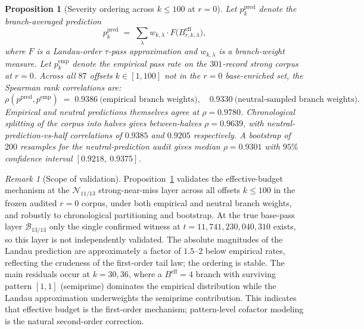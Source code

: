 \documentclass[11pt]{article}
\renewcommand{\_}{\origunderscore\allowbreak}
\newtheorem{proposition}[theorem]{Proposition}
\theoremstyle{definition}
\theoremstyle{remark}
\newtheorem{remark}[theorem]{Remark}
\begin{document}
\begin{proposition}[Severity ordering across $k\le 100$ at $r=0$]\label{prop:beff_ordering}
Let $p_k^{\mathrm{pred}}$ denote the branch-averaged prediction
\[
  p_k^{\mathrm{pred}}
  \;=\;
  \sum_{\lambda} w_{k,\lambda}\cdot
  F\bigl(B^{\mathrm{eff}}_{r,k,\lambda}\bigr),
\]
where $F$ is a Landau-order $\tau$-pass approximation and $w_{k,\lambda}$
is a branch-weight measure. Let $p_k^{\mathrm{emp}}$ denote the
empirical pass rate on the $301$-record strong corpus at $r=0$.
Across all $87$ offsets $k\in[1,100]$ not in the $r=0$
base-enriched set, the Spearman rank correlations are:
\[
  \rho(p^{\mathrm{pred}}, p^{\mathrm{emp}})
  \;=\;
  0.9386\ \text{(empirical branch weights)},
  \quad
  0.9330\ \text{(neutral-sampled branch weights)}.
\]
Empirical and neutral predictions themselves agree at
$\rho = 0.9780$. Chronological splitting of the corpus into halves
gives between-halves $\rho = 0.9639$, with neutral-prediction-vs-half
correlations of $0.9385$ and $0.9205$ respectively.
A bootstrap of $200$ resamples for the neutral-prediction audit gives
median $\rho = 0.9301$ with
$95\%$ confidence interval $[0.9218,\ 0.9375]$.
\end{proposition}

\begin{remark}[Scope of validation]
Proposition~\ref{prop:beff_ordering} validates the effective-budget
mechanism at the $\mathcal{N}_{11/13}$ strong-near-miss layer across
all offsets $k\le 100$ in the frozen audited $r=0$ corpus, under both
empirical and neutral branch weights, and robustly to chronological
partitioning and bootstrap. At the true base-pass layer
$\mathcal{B}_{13/13}$ only the single confirmed witness at
$t=11{,}741{,}230{,}040{,}310$ exists, so this layer is not
independently validated. The absolute magnitudes of the Landau
prediction are approximately a factor of $1.5$--$2$ below empirical
rates, reflecting the crudeness of the first-order tail law; the
ordering is stable. The main residuals occur at $k=30,36$, where a
$B^{\mathrm{eff}}=4$ branch with surviving pattern $[1,1]$ (semiprime)
dominates the empirical distribution while the Landau approximation
underweights the semiprime contribution. This indicates that
effective budget is the first-order mechanism; pattern-level
cofactor modeling is the natural second-order correction.
\end{remark}
\end{document}
